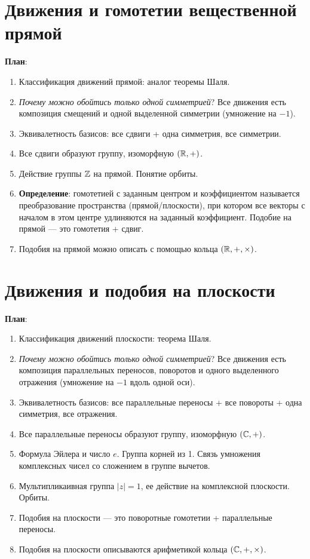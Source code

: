 \section{Движения и гомотетии вещественной прямой}



\textbf{План}:
\begin{enumerate}
\item Классификация движений прямой: аналог теоремы Шаля.
\item \textit{Почему можно обойтись только одной симметрией}? Все движения есть композиция смещений и одной выделенной симметрии (умножение на $-1$).
\item Эквивалетность базисов: все сдвиги + одна симметрия, все симметрии.
\item Все сдвиги образуют группу, изоморфную $(\mathbb R,+)$.
\item Действие группы $\mathbb Z$ на прямой. Понятие орбиты.
\item \textbf{Определение}: гомотетией с заданным центром и коэффициентом называется преобразование пространства (прямой/плоскости), при котором все векторы с началом в этом центре удлиняются на заданный коэффициент. Подобие на прямой --- это гомотетия + сдвиг.
\item Подобия на прямой можно описать с помощью кольца $(\mathbb R,+,\times)$.
\end{enumerate}



\section{Движения и подобия на плоскости}


\textbf{План}:
\begin{enumerate}
\item Классификация движений плоскости: теорема Шаля.
\item \textit{Почему можно обойтись только одной симметрией}? Все движения есть композиция параллельных переносов, поворотов и одного выделенного отражения (умножение на $-1$ вдоль одной оси).
\item Эквивалетность базисов: все параллельные переносы + все повороты + одна симметрия, все отражения.
\item Все параллельные переносы образуют группу, изоморфную $(\mathbb C,+)$.
\item Формула Эйлера и число $e$. Группа корней из 1. Связь умножения комплексных чисел со сложением в группе вычетов.
\item Мультипликаивная группа $|z|=1$, ее действие на комплексной плоскости. Орбиты.
\item Подобия на плоскости --- это поворотные гомотетии + параллельные переносы.
\item Подобия на плоскости описываются арифметикой кольца $(\mathbb C,+,\times)$.
\end{enumerate}



